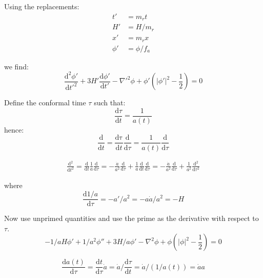 \documentclass[a4paper]{article}
\begin{document}
Using the replacements:
\begin{align}
    t' &= m_r t \\
    H' &= H / m_r \\
    x' &= m_r x \\
    \phi' &= \phi / f_a
\end{align}

we find:
\begin{equation}
    \frac{\mathrm{d}^2 \phi'}{\mathrm{d} t'^2} + 3 H' \frac{\mathrm{d} \phi'}{\mathrm{d} t'} - \nabla'^2 \phi + \phi' \left( |\phi'|^2 - \frac{1}{2} \right) = 0
\end{equation}

Define the conformal time $\tau$ such that:
\begin{equation}
    \frac{\mathrm{d} \tau}{\mathrm{d} t} = \frac{1}{a(t)}
\end{equation}
hence:
\begin{equation}
    \frac{\mathrm{d}}{\mathrm{d} t} = \frac{\mathrm{d \tau}}{\mathrm{d} t} \frac{\mathrm{d}}{\mathrm{d} \tau} = \frac{1}{a(t)} \frac{\mathrm{d}}{\mathrm{d} \tau}
\end{equation}

\begin{align}
    \frac{\mathrm{d}^2}{\mathrm{d} t^2} = \frac{\mathrm{d}}{\mathrm{d} t} \frac{1}{a} \frac{\mathrm{d}}{\mathrm{d} \tau}
    = - \frac{\dot{a}}{a^2} \frac{\mathrm{d}}{\mathrm{d} \tau} + \frac{1}{a} \frac{\mathrm{d}}{\mathrm{d} t} \frac{\mathrm{d}}{\mathrm{d} \tau}
     = - \frac{\dot{a}}{a^2} \frac{\mathrm{d}}{\mathrm{d} \tau} + \frac{1}{a^2} \frac{\mathrm{d}^2}{\mathrm{d} \tau^2}
\end{align}

where
\begin{equation}
    \frac{\mathrm{d} 1/a}{\mathrm{d} \tau} = - a' / a^2 = - a \dot{a} / a^2 = - H
\end{equation}

Now use unprimed quantities and use the prime as the derivative with respect to $\tau$.
\begin{equation}
    - 1/a H \phi' + 1/a^2 \phi'' + 3 H / a \phi'
    - \nabla^2 \phi + \phi \left( |\phi|^2 - \frac{1}{2} \right) = 0
\end{equation}

\begin{equation}
    \frac{\mathrm{d} a(t)}{\mathrm{d} \tau} = \frac{\mathrm{d} t}{\mathrm{d} \tau} \dot{a} = \dot{a} / \frac{\mathrm{d} \tau}{\mathrm{d} t} = \dot{a} / (1 / a(t)) = \dot{a} a
\end{equation}
\end{document}
